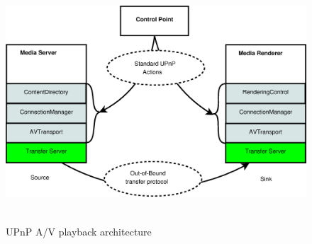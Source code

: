 \begin{figure}[htb]
\centering \includegraphics[height=9cm]{charts/upnp_playback}
\caption{UPnP A/V playback architecture \label{upnp_playback}}
\end{figure}

